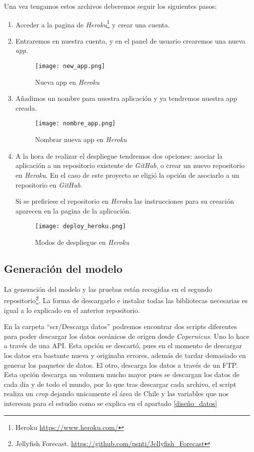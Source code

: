 Una vez tengamos estos archivos deberemos seguir los siguientes pasos:
\begin{enumerate}
	\item Acceder a la pagina de \emph{Heroku}\footnote{Heroku \url{https://www.heroku.com/}} y crear una cuenta.
	\item Entraremos en nuestra cuenta, y en el panel de usuario crearemos una nueva \emph{app}.
	\begin{figure}[!h]
		\centering
		\texttt{[image: new\_app.png]}
		\caption{Nueva app en \emph{Heroku}}\label{fig:new_app}
	\end{figure}
	\item Añadimos un nombre para nuestra aplicación y ya tendremos nuestra app creada.
	\begin{figure}[!h]
		\centering
		\texttt{[image: nombre\_app.png]}
		\caption{Nombrar nueva app en \emph{Heroku}}\label{fig:new_app}
	\end{figure}
	\item A la hora de realizar el despliegue tendremos dos opciones: asociar la aplicación a un repositorio existente de \emph{GitHub}, o crear un nuevo repositorio en \emph{Heroku}. En el caso de este proyecto se eligió la opción de asociarlo a un repositorio en \emph{GitHub}. 
	
	Si se prefiriese el repositorio en \emph{Heroku} las instrucciones para su creación aparecen en la pagina de la aplicación.
	\begin{figure}[!h]
		\centering
		\texttt{[image: deploy\_heroku.png]}
		\caption{Modos de despliegue en \emph{Heroku}}\label{fig:deploy}
	\end{figure}
		
\end{enumerate}

\subsection{Generación del modelo}

La generación del modelo y las pruebas están recogidas en el segundo repositorio\footnote{Jellyfish Forecast. \url{https://github.com/psnti/Jellyfish_Forecast}}. La forma de descargarlo e instalar todas las bibliotecas necesarias es igual a lo explicado en el anterior repositorio.

En la carpeta ``scr/Descarga datos'' podremos encontrar dos scripts diferentes para poder descargar los datos oceánicos de origen desde \emph{Copernicus}. Uno lo hace a través de una API. Esta opción se descartó, pues en el momento de descargar los datos era bastante nueva y originaba errores, además de tardar demasiado en generar los paquetes de datos. El otro, descarga los datos a través de un FTP. Esta opción descarga un volumen mucho mayor pues se descargan los datos de cada dia y de todo el mundo, por lo que tras descargar cada archivo, el script realiza un \emph{crop} dejando unicamente el área de Chile y las variables que nos interesan para el estudio como se explica en el apartado \ref{diseño_datos}

